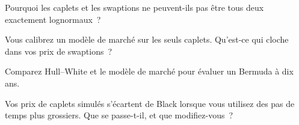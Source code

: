 \begin{interviewq}\label{iq:rc:forward-rate-and-market-models:3}
Pourquoi les caplets et les swaptions ne peuvent-ils pas être tous deux exactement lognormaux~?
\end{interviewq}

\begin{interviewq}\label{iq:rc:forward-rate-and-market-models:4}
Vous calibrez un modèle de marché sur les seuls caplets. Qu'est-ce qui cloche dans vos
prix de swaptions~?
\end{interviewq}

\begin{interviewq}\label{iq:rc:forward-rate-and-market-models:5}
Comparez Hull--White et le modèle de marché pour évaluer un Bermuda à dix ans.
\end{interviewq}

\begin{interviewq}\label{iq:rc:forward-rate-and-market-models:6}
Vos prix de caplets simulés s'écartent de Black lorsque vous utilisez des pas de temps
plus grossiers. Que se passe-t-il, et que modifiez-vous~?
\end{interviewq}
